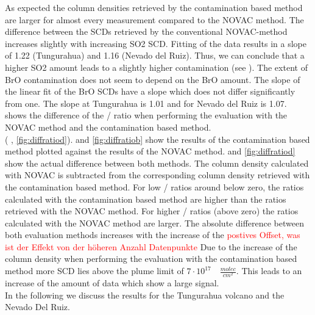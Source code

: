\documentclass  [
  paper    = a4,
  BCOR     = 10mm,
  twoside,
  fontsize = 12pt,
  fleqn,
  toc      = bibnumbered,
  toc      = listofnumbered,
  numbers  = noendperiod,
  headings = normal,
  listof   = leveldown,
  version  = 3.03
]                                       {scrreprt}
\begin{document}
	As expected the   column densities retrieved by the contamination based method are larger for almost every measurement compared to the NOVAC method. The difference between the  SCDs retrieved by the conventional NOVAC-method increases slightly with increasing SO2 SCD. Fitting of the data results in a slope of 1.22 (Tungurahua) and 1.16 (Nevado del Ruiz). Thus, we can conclude that  a higher SO2 amount leads to a slightly higher contamination (see ). The extent of BrO contamination does not seem to depend on the BrO amount. The slope of the linear fit of the BrO SCDs have a slope which does not differ significantly from one. The slope at Tungurahua is 1.01 and for Nevado del Ruiz  is 1.07. \\
	 shows the difference of the / ratio when performing the evaluation with the NOVAC method and the contamination based method.\\
	( , \ref{fig:diffratiod}).  and \ref{fig:diffratiob} show the results of the contamination based method plotted against the results of the NOVAC method.   and \ref{fig:diffratiod} show the actual difference between both methods. The column density calculated with NOVAC is subtracted from the corresponding column density retrieved with the contamination based method.  For low /  ratios around below zero, the ratios calculated with the contamination based method are higher than the ratios retrieved with the NOVAC method. For higher /  ratios (above zero) the ratios calculated with the NOVAC method are larger. The absolute difference between both evaluation methods increases with the increase of the 
\textcolor{red}{postives Offset, was ist der Effekt von der höheren Anzahl Datenpunkte}
	Due to the increase of the   column density when performing the evaluation with the contamination based method more   SCD lies above the plume limit of $7\cdot10^{17}\quad \frac{molec}{cm^2}$. This leads to an increase of the amount of data which show a large  signal.\\ 
	In the following we discuss the results for the Tungurahua volcano and the Nevado Del Ruiz. 
\end{document}
